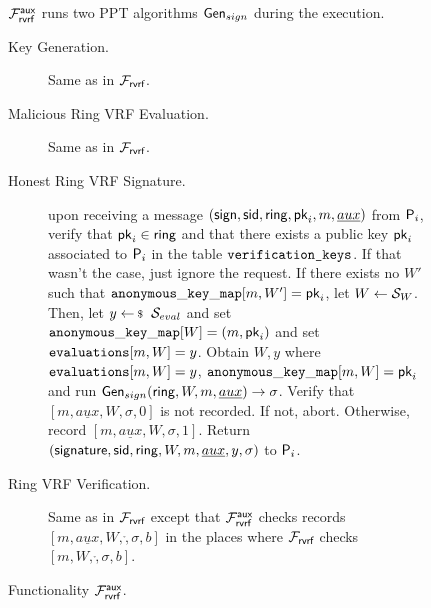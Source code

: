 \begin{figure}
\begin{tcolorbox}
	{  $ \mathcal{F}_{\textsf{rvrf}}^{\mathsf{aux}} $ runs two PPT algorithms $\mathsf{Gen}_{sign} $ during the execution.
		
		\begin{description}
			
			\item[Key Generation.] Same as in $ \mathcal{F}_{\textsf{rvrf}} $.
			
			\item[Malicious Ring VRF Evaluation.] Same as in $ \mathcal{F}_{\textsf{rvrf}} $.
			
			\item[Honest Ring VRF Signature.] upon receiving a message $(\mathsf{sign}, \textsf{sid}, \mathsf{ring}, \mathsf{pk}_i, m, \underline{aux})$ from $\mathsf{P}_i$, verify that $\mathsf{pk}_i \in \mathsf{ring}$ and that there exists a public key $\mathsf{pk}_i$ associated to $\mathsf{P}_i$ in the table $ \texttt{verification\_keys} $. If that wasn't the case, just ignore the request. 	
			If there exists no $ W' $ such that $ \mathtt{anonymous\_key\_map}[m,W'] =  \mathsf{pk}_i $, let $ W \leftarrow {\ensuremath{\mathcal{S}}}_W$. Then, let $y \leftsample \setsym{S}_{eval}$ and set $ \mathtt{anonymous\_key\_map}[W] = (m,\mathsf{pk}_i) $ and set $ \texttt{evaluations}[m, W] = y$.
		Obtain $ W, y $ where  $ \texttt{evaluations}[m, W] = y$, $ \mathtt{anonymous\_key\_map}[m,W] = \mathsf{pk}_i $ and run  $ \mathsf{Gen}_{sign}(\mathsf{ring}, W, m,\underline{aux}) \rightarrow \sigma $. Verify that $ [m, \underline{aux},W, \sigma, 0] $ is not recorded. If not, abort. Otherwise, record $ [m,\underline{aux}, W, \sigma, 1] $. Return $(\mathsf{signature}, \textsf{sid}, \mathsf{ring},W,m,\underline{aux}, y, \sigma)$ to $\mathsf{P}_i$.
		\item[Ring VRF Verification.] Same as in $ \mathcal{F}_{\textsf{rvrf}} $ except that $ \mathcal{F}_{\textsf{rvrf}}^{\mathsf{aux}} $ checks records $  [m,\underline{aux},W,\ring,\sigma, b]   $ in the places where $ \mathcal{F}_{\textsf{rvrf}} $ checks $ [m,W,\ring,\sigma, b] $.
	\end{description}
	
}
\end{tcolorbox}
\caption{Functionality $\mathcal{F}_{\textsf{rvrf}}^{\mathsf{aux}}$.\label{f:aux}}
\end{figure}



